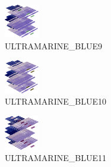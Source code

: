 \hspace{0.1cm}
\begin{minipage}[b]{0.15\linewidth}
\begin{figure}[H]                                                          
  \centering                                                             
  \begin{adjustbox}{width=1.5cm,center}                                   
  \includegraphics[width=1.5cm]{src/colorspace_colourflow/flows/colourflow_121-45.png}%
  \end{adjustbox}                                                        
\caption*{ULTRAMARINE\_BLUE9}                                           
\end{figure}                                                               
\end{minipage}
\hspace{0.1cm}
\begin{minipage}[b]{0.15\linewidth}
\begin{figure}[H]                                                          
  \centering                                                             
  \begin{adjustbox}{width=1.5cm,center}                                   
  \includegraphics[width=1.5cm]{src/colorspace_colourflow/flows/colourflow_122-45.png}%
  \end{adjustbox}                                                        
\caption*{ULTRAMARINE\_BLUE10}                                           
\end{figure}                                                               
\end{minipage}
\hspace{0.1cm}
\begin{minipage}[b]{0.15\linewidth}
\begin{figure}[H]                                                          
  \centering                                                             
  \begin{adjustbox}{width=1.5cm,center}                                   
  \includegraphics[width=1.5cm]{src/colorspace_colourflow/flows/colourflow_123-45.png}%
  \end{adjustbox}                                                        
\caption*{ULTRAMARINE\_BLUE11}                                           
\end{figure}                                                               
\end{minipage}
